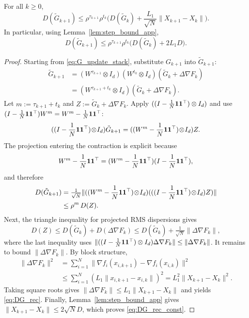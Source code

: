 \documentclass[review,onefignum,onetabnum]{siamart171218}
\begin{document}
	\begin{lemma}\label{lem:DG_rec}
		For all $k\ge0$,
		\begin{equation}\label{eq:DG_rec}
			D(\tilde G_{k+1})
			\le \rho^{\tau_{k+1}}\rho^{t_k}\Big(D(\tilde G_k)+\frac{L_1}{\sqrt N}\|X_{k+1}-X_k\|\Big).
		\end{equation}
		In particular, using Lemma~\ref{lem:step_bound_app},
		\begin{equation}\label{eq:DG_rec_const}
			D(\tilde G_{k+1})
			\le \rho^{\tau_{k+1}}\rho^{t_k}\Big(D(\tilde G_k)+2L_1D\Big).
		\end{equation}
	\end{lemma}
	\begin{proof}
		Starting from \eqref{eq:G_update_stack}, substitute $G_{k+1}$ into $\tilde G_{k+1}$:
		\begin{align*}
			\tilde G_{k+1}
			&=(W^{\tau_{k+1}}\!\otimes\! I_d)(W^{t_k}\!\otimes\! I_d)(\tilde G_k\!+\!\Delta\nabla F_k)\\
			&=(W^{\tau_{k+1}+t_k}\!\otimes\! I_d)(\tilde G_k\!+\!\Delta\nabla F_k).
		\end{align*}
		Let $m:=\tau_{k+1}+t_k$ and $Z:=\tilde G_k+\Delta\nabla F_k$.
		Apply $((I-\frac{1}{N}\mathbf{1}\mathbf{1}^\top)\otimes I_d)$ and use $(I-\frac{1}{N}\mathbf{1}\mathbf{1}^\top) W^m=W^m-\frac{1}{N}\mathbf{1}\mathbf{1}^\top$:
		\[
		((I-\frac{1}{N}\mathbf{1}\mathbf{1}^\top)\!\otimes\! I_d)\tilde G_{k+1}
		=((W^m-\frac{1}{N}\mathbf{1}\mathbf{1}^\top)\!\otimes\! I_d)Z.
		\]
		The projection entering the contraction is explicit because
		\[
		W^m-\frac{1}{N}\mathbf{1}\mathbf{1}^\top=(W^m-\frac{1}{N}\mathbf{1}\mathbf{1}^\top)(I-\frac{1}{N}\mathbf{1}\mathbf{1}^\top),
		\]
		and therefore
		\begin{align*}
			D(\tilde G_{k+1})
			&=\tfrac1{\sqrt N}\|((W^m-\frac{1}{N}\mathbf{1}\mathbf{1}^\top)\!\otimes\! I_d)
			(((I-\frac{1}{N}\mathbf{1}\mathbf{1}^\top)\!\otimes\! I_d)Z)\|\\
			&\le \rho^m\,D(Z).
		\end{align*}
		Next, the triangle inequality for projected RMS dispersions gives
		\[
		D(Z)\le D(\tilde G_k)+D(\Delta\nabla F_k)
		\le D(\tilde G_k)+\tfrac1{\sqrt N}\|\Delta\nabla F_k\|,
		\]
		where the last inequality uses
		$\|((I-\frac{1}{N}\mathbf{1}\mathbf{1}^\top)\otimes I_d)\Delta\nabla F_k\|\le\|\Delta\nabla F_k\|$.
		It remains to bound $\|\Delta\nabla F_k\|$.
		By block structure,
		\begin{align*}
			\|\Delta\nabla F_k\|^2
			&=\textstyle\sum_{i=1}^N\|\nabla f_i(x_{i,k+1})\!-\!\nabla f_i(x_{i,k})\|^2\\
			&\le \textstyle\sum_{i=1}^N (L_1\|x_{i,k+1}\!-\!x_{i,k}\|)^2
			=L_1^2\|X_{k+1}\!-\!X_k\|^2.
		\end{align*}
		Taking square roots gives $\|\Delta\nabla F_k\|\le L_1\|X_{k+1}-X_k\|$ and yields \eqref{eq:DG_rec}.
		Finally, Lemma~\ref{lem:step_bound_app} gives
		$\|X_{k+1}-X_k\|\le 2\sqrt N D$, which proves
		\eqref{eq:DG_rec_const}.
	\end{proof}
	
\end{document}
